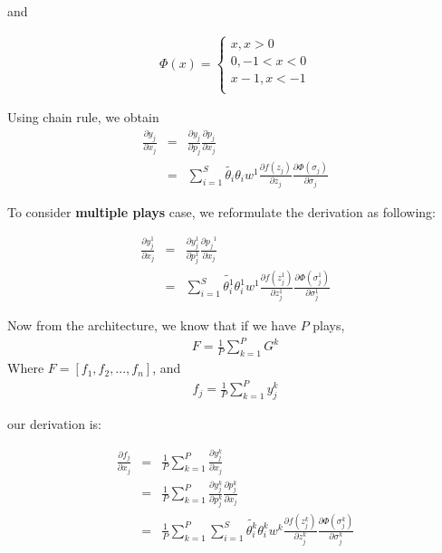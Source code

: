 \documentclass[11pt]{article}
\begin{document}
and

\begin{eqnarray}
\Phi(x) =
        \begin{cases}
        x, x > 0 \\
        0, -1 < x < 0 \\
        x-1, x < -1 \\
        \end{cases}

\end{eqnarray}

Using chain rule, we obtain
\begin{eqnarray}
\frac{\partial y_{j}}{\partial x_{j}} &=& \frac{\partial y_{j}}{\partial p_{j}} \frac{\partial p_{j}}{\partial x_{j}} \\
                                      &=& \sum_{i=1}^{S} \tilde{\theta_{i}} \theta_{i} w^{1} \frac{\partial f(z_j)}{\partial z_{j}} \frac{\partial{\Phi(\sigma_{j})}}{\partial{\sigma_{j}}}
\end{eqnarray}


To consider \textbf{multiple plays} case, we reformulate the derivation as following:

\begin{eqnarray}
\frac{\partial {y_{j}^{1}}}{\partial x_{j}} &=& \frac{\partial{y_{j}^{1}}}{\partial{p_{j}^{1}}} \frac{\partial{ p_{j}}^{1}}{\partial x_{j}} \\
                                      &=& \sum_{i=1}^{S} \tilde{\theta_{i}^{1}} \theta_{i}^{1} w^{1} \frac{\partial f(z_{j}^{1})}{\partial z_{j}^{1}} \frac{\partial{\Phi(\sigma_{j}^{1})}}{\partial{\sigma_{j}^{1}}}
\end{eqnarray}


Now from the architecture, we know that if we have \(P\) plays,
\begin{eqnarray}
F = \frac{1}{P} \sum_{k=1}^{P} G^{k}
\end{eqnarray}
Where \(F=[f_1, f_2, ..., f_n]\),
and
\begin{eqnarray}
f_{j} = \frac{1}{P} \sum_{k=1}^{P} y_{j}^{k}
\end{eqnarray}

our derivation is:

\begin{eqnarray}
\frac{\partial f_{j}}{\partial x_{j}} &=& \frac{1}{P} \sum_{k=1}^{P} \frac{\partial {{y_{j}^{k}}}}{\partial {{x_{j}}}} \\
               &=& \frac{1}{P} \sum_{k=1}^{P} \frac{\partial {y_{j}^{k}}}{\partial {p_{j}^{k}}} \frac{\partial {p_{j}^{k}}}{\partial {x_{j}}} \\
               &=& \frac{1}{P} \sum_{k=1}^{P}  \sum_{i=1}^{S} \tilde{\theta_{i}^{k}} \theta_{i}^{k} w^{k} \frac{\partial f(z_{j}^{k})}{\partial z_{j}^{k}} \frac{\partial{\Phi(\sigma_{j}^{k})}}{\partial{\sigma_{j}^{k}}} \\
\end{eqnarray}
\end{document}
